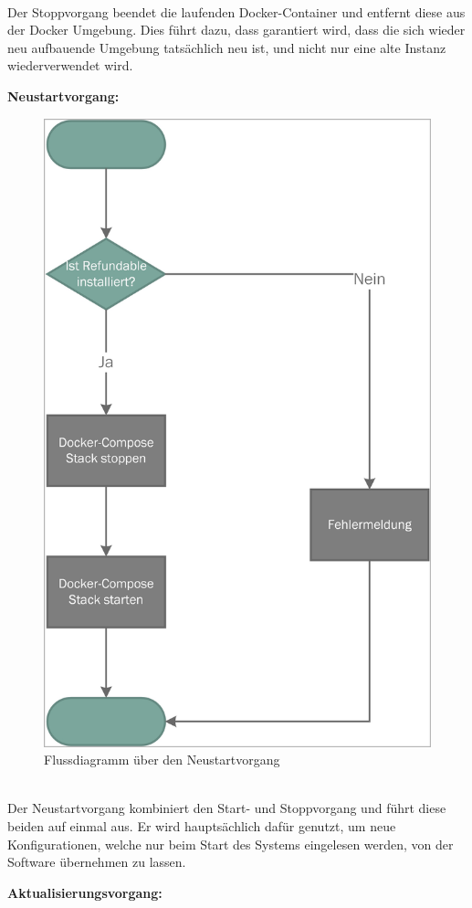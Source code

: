 ~\\
Der Stoppvorgang beendet die laufenden Docker-Container und entfernt diese aus der Docker Umgebung. Dies führt dazu, dass garantiert wird, dass die sich wieder neu aufbauende Umgebung tatsächlich neu ist, und nicht nur eine alte Instanz wiederverwendet wird.

\newpage

\textbf{Neustartvorgang:}

\begin{figure}[H]
	\centering
	\includegraphics[width=0.5\linewidth]{images/mbeier_konzept/Restart_border}
	\caption[Flussdiagramm über den Neustartvorgang]{Flussdiagramm über den Neustartvorgang}
	\label{fig:restart}
\end{figure}
~\\
Der Neustartvorgang kombiniert den Start- und Stoppvorgang und führt diese beiden auf einmal aus. Er wird hauptsächlich dafür genutzt, um neue Konfigurationen, welche nur beim Start des Systems eingelesen werden, von der Software übernehmen zu lassen.

\newpage

\textbf{Aktualisierungsvorgang:}

